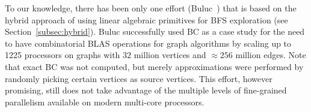 %
%
To our knowledge, there has been only one effort (Buluc~\cite{buluc-2010}) that
is based on the hybrid approach of using linear algebraic primitives for BFS
exploration (see Section~\ref{subsec:hybrid}).
%
Buluc successfully used BC as a case study for the need to have combinatorial
BLAS operations for graph algorithms by scaling up to 1225 processors on 
graphs with $32$ million vertices and $\approx{}256$ million edges.
%
Note that exact BC was not computed, but merely approximations were performed
by randomly picking certain vertices as source vertices.
%
This effort, however promising, still does not take advantage of the multiple
levels of fine-grained parallelism available on modern multi-core processors.


